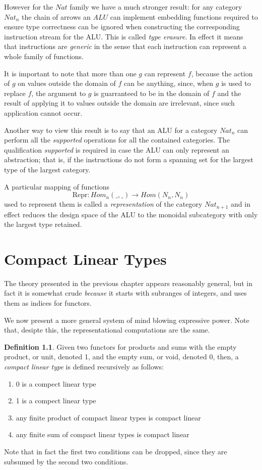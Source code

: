\documentclass[oneside]{book}
\theoremstyle{plain}
\theoremstyle{definition}
\newtheorem{definition}{Definition}
\theoremstyle{plain}
\def\Nat{\mathit{Nat}}
\def\Hom{\mathit{Hom}}
\def\ALU{\mathit{ALU}}
\begin{document}
However for the $\Nat$ family we have a much stronger result: for any
category $\Nat_n$ the chain of arrows an $\ALU$ can implement embedding
functions required to ensure type correctness can be ignored when constructing
the corresponding instruction stream for the ALU.
This is called {\em type erasure}. In effect it means that instructions
are {\em generic} in the sense that each instruction can represent a whole
family of functions.

It is important to note that more than one $g$ can represent $f$, because
the action of $g$ on values outside the domain of $f$ can be anything,
since, when $g$ is used to replace $f$, the argument to $g$ is guarranteed
to be in the domain of $f$ and the result of applying it to values
outside the domain are irrelevant, since such application cannot occur.

Another way to view this result is to say that an ALU for a category
$Nat_n$ can perform all the {\em supported} operations for all the contained
categories. The qualification {\em supported} is required in case
the ALU can only represent an abstraction; that is, if the instructions
do not form a spanning set for the largest type of the largest category.

A particular mapping of functions 
$$\mathrm{Repr}: \Hom_n(\_,\_) \rightarrow \Hom(N_n, N_n)$$
used to represent them is called a {\em representation} of 
the category $\Nat_{n+1}$ and in effect reduces the design
space of the ALU to the monoidal subcategory with only
the largest type retained.



\chapter{Compact Linear Types}
The theory presented in the previous chapter appears reasonably general,
but in fact it is somewhat crude {\em because} it starts with subranges
of integers, and uses them as indices for functors.

We now present a more general system of mind blowing expressive power.
Note that, desipte this, the representational computations are the same.

\begin{definition}
Given two functors for products and sums with the empty product, or unit,
denoted 1, and the empty sum, or void, denoted 0, then, a {\em compact
linear type} is defined recursively as follows:
\begin{enumerate}
\item 0 is a compect linear type
\item 1 is a compect linear type
\item any finite product of compact linear types is compact linear
\item any finite sum of compact linear types is compact linear
\end{enumerate}
Note that in fact the first two conditions can be dropped, since
they are subsumed by the second two conditions. 
\end{definition}
\end{document}
